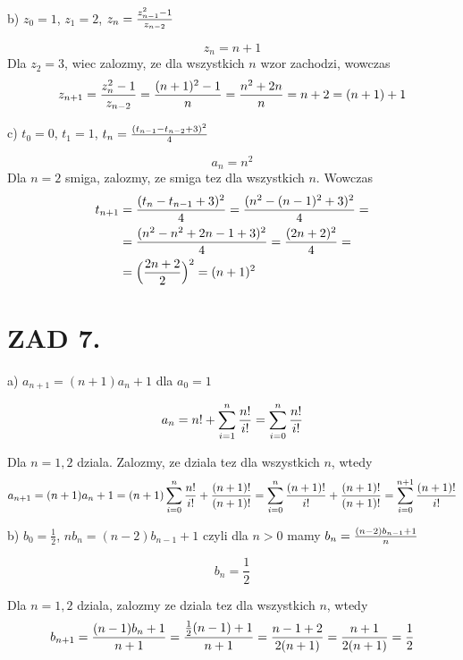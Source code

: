 \documentclass{article}[13pt]
\begin{document}
    \medskip

    b) $z_0=1$, $z_1=2$, $z_n={z_{n-1}^2-1\over z_{n-2}}$

    $$z_n=n+1$$
    Dla $z_2=3$, wiec zalozmy, ze dla wszystkich $n$ wzor zachodzi, wowczas
    \begin{align*}
        z_{n+1}={z_n^2-1\over z_{n-2}}={(n+1)^2-1\over n}={n^2+2n\over n}=n+2=(n+1)+1
    \end{align*}

    \medskip

    c) $t_0=0$, $t_1=1$, $t_n={(t_{n-1}-t_{n-2}+3)^2\over 4}$
    
    $$a_n=n^2$$
    Dla $n=2$ smiga, zalozmy, ze smiga tez dla wszystkich $n$. Wowczas
    \begin{align*}
        t_{n+1}&={(t_n-t_{n-1}+3)^2\over 4}={(n^2-(n-1)^2+3)^2\over 4}=\\
        &={(n^2-n^2+2n-1+3)^2\over 4}={(2n+2)^2\over 4}=\\
        &=\Big({2n+2\over 2}\Big)^2=(n+1)^2
    \end{align*}

    \section*{ZAD 7.}
    
    a) $a_{n+1}=(n+1)a_n+1$ dla $a_0=1$

    \begin{align*}
        a_n=n!+\sum\limits_{i=1}^n{n!\over i!}=\sum\limits_{i=0}^n{n!\over i!}
    \end{align*}
    
    Dla $n=1,2$ dziala. Zalozmy, ze dziala tez dla wszystkich $n$, wtedy
    \begin{align*}
        a_{n+1}=(n+1)a_n+1=(n+1)\sum\limits_{i=0}^n{n!\over i!}+{(n+1)!\over(n+1)!}=\sum\limits_{i=0}^n{(n+1)!\over i!}+{(n+1)!\over(n+1)!}=\sum\limits_{i=0}^{n+1}{(n+1)!\over i!}
    \end{align*}

    \medskip
    
    b) $b_0=\frac12$, $nb_n=(n-2)b_{n-1}+1$ czyli dla $n>0$ mamy $b_n={(n-2)b_{n-1}+1\over n}$

    $$b_n=\frac12$$

    Dla $n=1,2$ dziala, zalozmy ze dziala tez dla wszystkich $n$, wtedy
    \begin{align*}
        b_{n+1}={(n-1)b_{n}+1\over n+1}={\frac12(n-1)+1\over n+1}={n-1+2\over 2(n+1)}={n+1\over 2(n+1)}=\frac12
    \end{align*}
\end{document}
